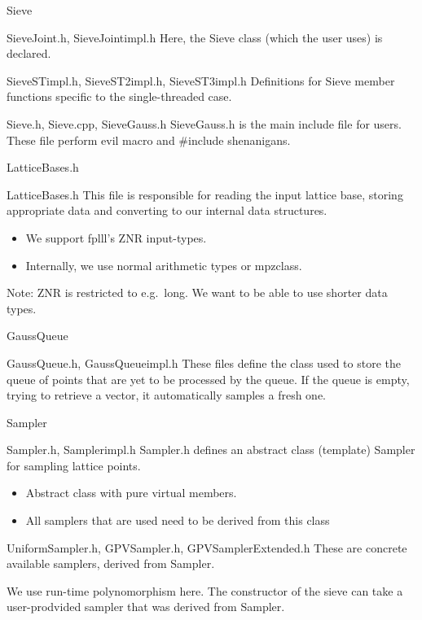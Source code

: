 \documentclass{beamer}
\begin{document}
\begin{frame}{Sieve}
\begin{block}{SieveJoint.h, SieveJoint\textunderscore impl.h}
Here, the Sieve class (which the user uses) is declared.
\end{block}
\begin{block}{SieveST\textunderscore  impl.h, SieveST2\textunderscore impl.h, SieveST3\textunderscore impl.h}
Definitions for Sieve member functions specific to the single-threaded case.
\end{block}
\begin{block}{Sieve.h, Sieve.cpp, SieveGauss.h}
SieveGauss.h is the main include file for users.\\
These file perform evil macro and $\#$include shenanigans.
\end{block}
\end{frame}

\begin{frame}{LatticeBases.h}
\begin{block}{LatticeBases.h}
This file is responsible for reading the input lattice base, storing appropriate data and converting to our internal data structures.
\begin{itemize}
\item We support fplll's Z\textunderscore NR input-types.
\item Internally, we use normal arithmetic types or mpz\textunderscore class.
\end{itemize}
Note: Z\textunderscore NR is restricted to e.g.\ long. We want to be able to use shorter data types.
\end{block}
\end{frame}

\begin{frame}{GaussQueue}
\begin{block}{GaussQueue.h, GaussQueue\textunderscore impl.h}
These files define the class used to store the queue of points that are yet to be processed by the queue.
If the queue is empty, trying to retrieve a vector, it automatically samples a fresh one.
\end{block}
\end{frame}

\begin{frame}{Sampler}
\begin{block}{Sampler.h, Sampler\textunderscore impl.h}
Sampler.h defines an abstract class (template) Sampler for sampling lattice points.
\begin{itemize}
\item Abstract class with pure virtual members.
\item All samplers that are used need to be derived from this class
\end{itemize}
\end{block}
\begin{block}{UniformSampler.h, GPVSampler.h, GPVSamplerExtended.h}
These are concrete available samplers, derived from Sampler.
\end{block}
We use run-time polynomorphism here. The constructor of the sieve can take a user-prodvided sampler that was derived from Sampler.
\end{frame}
\end{document}
